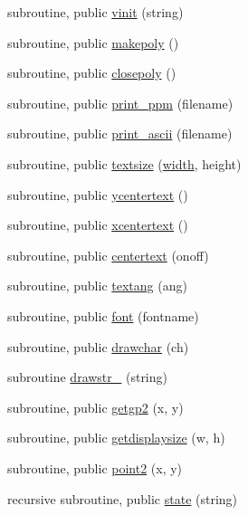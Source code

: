 \begin{DoxyCompactItemize}
subroutine, public \mbox{\hyperlink{namespacem__pixel_ac03ca8f23fdadb60599b6ea4dc87a6d9}{vinit}} (string)
\item 
subroutine, public \mbox{\hyperlink{namespacem__pixel_ab7128437f95b40004bf73fc6e3f597f8}{makepoly}} ()
\item 
subroutine, public \mbox{\hyperlink{namespacem__pixel_ab3dc83b63d2ab1bf3f63932abca4245d}{closepoly}} ()
\item 
subroutine, public \mbox{\hyperlink{namespacem__pixel_a01797b04ce7c693c3fd6a841e8d1de48}{print\+\_\+ppm}} (filename)
\item 
subroutine, public \mbox{\hyperlink{namespacem__pixel_ab2bb47aea567667b1b92c8265bcb36fb}{print\+\_\+ascii}} (filename)
\item 
subroutine, public \mbox{\hyperlink{namespacem__pixel_a070e9fff1f2cd0c89d40c5d3c72b7f2c}{textsize}} (\mbox{\hyperlink{namespacem__pixel_abf266872f93a04af39d2903fb20d2a0d}{width}}, height)
\item 
subroutine, public \mbox{\hyperlink{namespacem__pixel_a2e32105b5e77abf38768fec6b11376a3}{ycentertext}} ()
\item 
subroutine, public \mbox{\hyperlink{namespacem__pixel_a1e0c43d36b35eafea921f91c31d8a478}{xcentertext}} ()
\item 
subroutine, public \mbox{\hyperlink{namespacem__pixel_a9ddc8e8604bbc3181c728f08a6b87904}{centertext}} (onoff)
\item 
subroutine, public \mbox{\hyperlink{namespacem__pixel_a5e213461e9894b99c9e8f278d5c4a858}{textang}} (ang)
\item 
subroutine, public \mbox{\hyperlink{namespacem__pixel_a566adb827a3a26ba42d4e86e4c6e12af}{font}} (fontname)
\item 
subroutine, public \mbox{\hyperlink{namespacem__pixel_a58406ffd6c2a9fdf2ea7772198b54255}{drawchar}} (ch)
\item 
subroutine \mbox{\hyperlink{namespacem__pixel_a3f8850328e359af5802954b2f70652f5}{drawstr\+\_\+}} (string)
\item 
subroutine, public \mbox{\hyperlink{namespacem__pixel_a626d769d3dae0c292e3ef1617ad43efb}{getgp2}} (x, y)
\item 
subroutine, public \mbox{\hyperlink{namespacem__pixel_acacbc4462423b9aa0f591cbe7aba4ec6}{getdisplaysize}} (w, h)
\item 
subroutine, public \mbox{\hyperlink{namespacem__pixel_a11234e0b33104eb0afb24f928b072053}{point2}} (x, y)
\item 
recursive subroutine, public \mbox{\hyperlink{namespacem__pixel_aa24c465b23b0ddda341e97bc206fe249}{state}} (string)

\end{DoxyCompactItemize}
